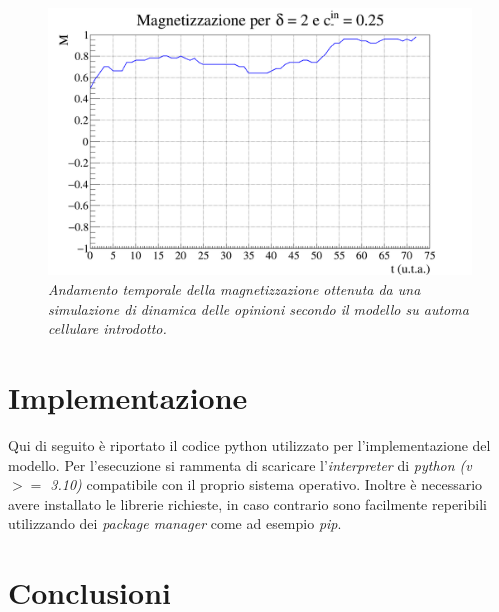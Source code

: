 \documentclass[letterpaper,10pt]{article}
\begin{document}
\begin{figure}[h]
\centering
\includegraphics[width = 1.1\linewidth]{poland_sim_magnetization_graph.png}
\caption{\textit{Andamento temporale della magnetizzazione ottenuta da una simulazione di dinamica delle opinioni secondo il modello su automa cellulare introdotto. }}
\label{Fig:21}
\end{figure}

\section{Implementazione}
\label{Sec:5}
Qui di seguito è riportato il codice python utilizzato per l'implementazione del modello. Per l'esecuzione si rammenta di scaricare l'\textit{interpreter} di \textit{python (v ${>=}$ 3.10)} compatibile con il proprio sistema operativo. Inoltre è necessario avere installato le librerie richieste, in caso contrario sono facilmente reperibili utilizzando dei \textit{package manager} come ad esempio \textit{pip}.

\section{Conclusioni}
\label{Sec:6}


\medskip

\printbibliography[title={Bibliografia}]
\end{document}
